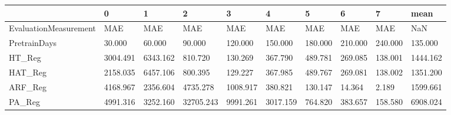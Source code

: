 \begin{tabular}{llllllllll}
\toprule
{} &        0 &        1 &         2 &        3 &        4 &       5 &       6 &       7 &     mean \\
\midrule
EvaluationMeasurement &      MAE &      MAE &       MAE &      MAE &      MAE &     MAE &     MAE &     MAE &      NaN \\
PretrainDays          &   30.000 &   60.000 &    90.000 &  120.000 &  150.000 & 180.000 & 210.000 & 240.000 &  135.000 \\
HT\_Reg                & 3004.491 & 6343.162 &   810.720 &  130.269 &  367.790 & 489.781 & 269.085 & 138.001 & 1444.162 \\
HAT\_Reg               & 2158.035 & 6457.106 &   800.395 &  129.227 &  367.985 & 489.767 & 269.081 & 138.002 & 1351.200 \\
ARF\_Reg               & 4168.967 & 2356.604 &  4735.278 & 1008.917 &  380.821 & 130.147 &  14.364 &   2.189 & 1599.661 \\
PA\_Reg                & 4991.316 & 3252.160 & 32705.243 & 9991.261 & 3017.159 & 764.820 & 383.657 & 158.580 & 6908.024 \\
\bottomrule
\end{tabular}
